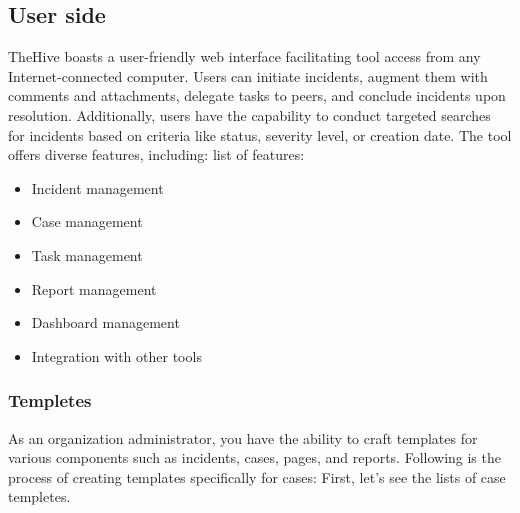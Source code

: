 \documentclass{article}
\begin{document}
\subsection{User side}
TheHive boasts a user-friendly web interface facilitating tool access from any Internet-connected computer. Users can initiate incidents, augment them with comments and attachments, delegate tasks to peers, and conclude incidents upon resolution. Additionally, users have the capability to conduct targeted searches for incidents based on criteria like status, severity level, or creation date. The tool offers diverse features, including:
list of features:
\begin{itemize}
\item Incident management
\item Case management
\item Task management
\item Report management
\item Dashboard management
\item Integration with other tools
\end{itemize}

\subsubsection{Templetes}
As an organization administrator, you have the ability to craft templates for various components such as incidents, cases, pages, and reports. Following is the process of creating templates specifically for cases:
First, let's see the lists of case templetes.\\
\end{document}

